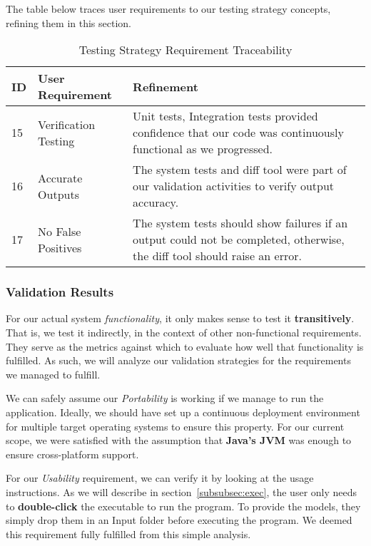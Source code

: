 The table below traces user requirements to our testing strategy concepts, refining them in this section.
\begin{table}[htbp]
    \centering
    \caption{Testing Strategy Requirement Traceability}\label{tab:test-strat-table}
    \begin{tabularx}{\textwidth}{| l | l | X |}
        \hline
        \textbf{ID} & \textbf{User Requirement} & \textbf{Refinement} \\
        \hline
        15 & Verification Testing & Unit tests, Integration tests provided confidence that our code was continuously functional as we progressed. \\ \hline
        16 & Accurate Outputs & The system tests and diff tool were part of our validation activities to verify output accuracy. \\ \hline
        17 & No False Positives & The system tests should show failures if an output could not be completed, otherwise, the diff tool should raise an error. \\ \hline
    \end{tabularx}
\end{table}
\newpage
\subsubsection{Validation Results}\label{subsubsec:test-validation}
For our actual system \textit{functionality}, it only makes sense to test it \textbf{transitively}.
That is, we test it indirectly, in the context of other non-functional requirements.
They serve as the metrics against which to evaluate how well that functionality is fulfilled.
As such, we will analyze our validation strategies for the requirements we managed to fulfill.

We can safely assume our \textit{Portability} is working if we manage to run the application.
Ideally, we should have set up a continuous deployment environment for multiple target operating systems to ensure this property.
For our current scope, we were satisfied with the assumption that
\textbf{Java's JVM} was enough to ensure cross-platform support.

For our \textit{Usability} requirement, we can verify it by looking at the usage instructions.
As we will describe in section~\ref{subsubsec:exec}, the user only needs to \textbf{double-click} the executable to run the program.
To provide the models, they simply drop them in an Input folder before executing the program.
We deemed this requirement fully fulfilled from this simple analysis.

